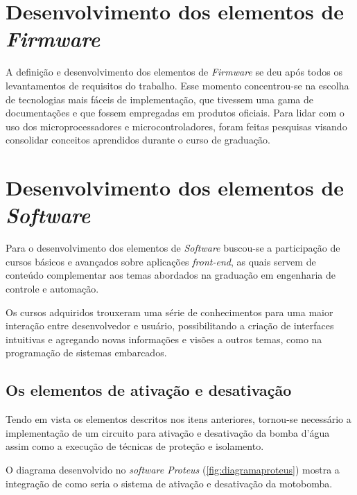 \section{Desenvolvimento dos elementos de \textit{Firmware}}
\label{sec: dev_ele_hardware}

A definição e desenvolvimento dos elementos de \textit{Firmware} se deu após todos os levantamentos de requisitos do trabalho. Esse momento concentrou-se na escolha de tecnologias mais fáceis de implementação, que tivessem uma gama de documentações e que fossem empregadas em produtos oficiais. Para lidar com o uso dos microprocessadores e microcontroladores, foram feitas pesquisas visando consolidar conceitos aprendidos durante o curso de graduação.

\section{Desenvolvimento dos elementos de \textit{Software}}

Para o desenvolvimento dos elementos de \textit{Software} buscou-se a participação de cursos básicos e avançados sobre aplicações \textit{front-end}, as quais servem de conteúdo complementar aos temas abordados na graduação em engenharia de controle e automação.

Os cursos adquiridos trouxeram uma série de conhecimentos para uma maior interação entre desenvolvedor e usuário, possibilitando a criação de interfaces intuitivas e agregando novas informações e visões a outros temas, como na programação de sistemas embarcados.

\subsection{Os elementos de ativação e desativação}

Tendo em vista os elementos descritos nos itens anteriores, tornou-se necessário a implementação de um circuito para ativação e desativação da bomba d'água assim como a execução de técnicas de proteção e isolamento.

O diagrama desenvolvido no \textit{software Proteus} (\autoref{fig:diagramaproteus}) mostra a integração de como seria o sistema de ativação e desativação da motobomba.

